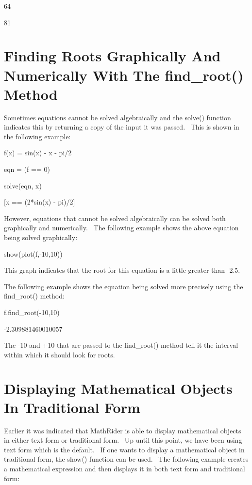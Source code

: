 \documentclass[12pt,twoside]{book}
\begin{document}
64

81

\section[Finding Roots Graphically And Numerically With The
find\_root() Method]{Finding Roots Graphically And Numerically
With The find\_root() Method}
Sometimes equations cannot be solved algebraically and the solve()
function indicates this by returning a copy of the input it was passed.
\ This is shown in the following example:


\bigskip

f(x) = sin(x) {}- x {}- pi/2

eqn = (f == 0)

solve(eqn, x)

{\textbar}

[x == (2*sin(x) {}- pi)/2]


\bigskip

However, equations that cannot be solved algebraically can be solved
both graphically and numerically. \ The following example shows the
above equation being solved graphically:


\bigskip

show(plot(f,{}-10,10))

{\textbar}


\bigskip

This graph indicates that the root for this equation is a little greater
than {}-2.5.


\bigskip

The following example shows the equation being solved more precisely
using the find\_root() method:


\bigskip

f.find\_root({}-10,10)

{\textbar}

{}-2.309881460010057


\bigskip

The {}-10 and +10 that are passed to the find\_root() method tell it the
interval within which it should look for roots.

\section[Displaying Mathematical Objects In Traditional
Form]{Displaying Mathematical Objects In Traditional Form}
Earlier it was indicated that MathRider is able to display mathematical
objects in either text form or traditional form. \ Up until this point,
we have been using text form which is the default. \ If one wants to
display a mathematical object in traditional form, the show() function
can be used. \ The following example creates a mathematical expression
and then displays it in both text form and traditional form:
\end{document}
